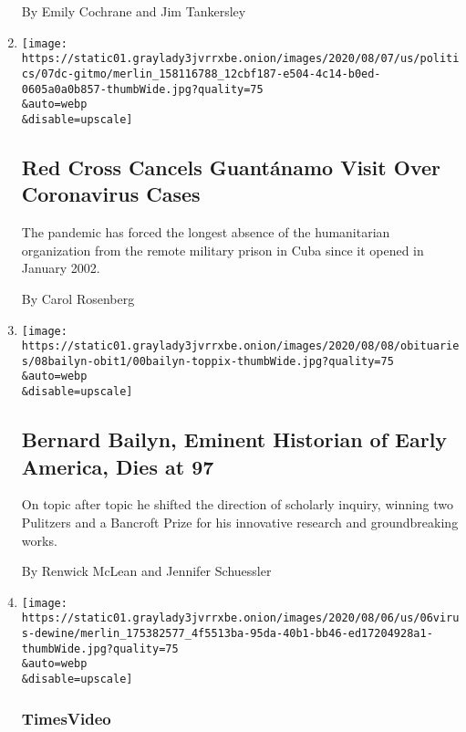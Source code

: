 \begin{enumerate}
  By Emily Cochrane and Jim Tankersley
\item
  \href{/2020/08/07/us/politics/red-cross-guantanamo-coronavirus.html}{}

  \texttt{[image: https://static01.graylady3jvrrxbe.onion/images/2020/08/07/us/politics/07dc-gitmo/merlin\_158116788\_12cbf187-e504-4c14-b0ed-0605a0a0b857-thumbWide.jpg?quality=75\\\&auto=webp\\\&disable=upscale]}

  \hypertarget{red-cross-cancels-guantuxe1namo-visit-over-coronavirus-cases}{%
  \subsection{Red Cross Cancels Guantánamo Visit Over Coronavirus
  Cases}\label{red-cross-cancels-guantuxe1namo-visit-over-coronavirus-cases}}

  The pandemic has forced the longest absence of the humanitarian
  organization from the remote military prison in Cuba since it opened
  in January 2002.

  By Carol Rosenberg
\item
  \href{/2020/08/07/books/bernard-bailyn-dead.html}{}

  \texttt{[image: https://static01.graylady3jvrrxbe.onion/images/2020/08/08/obituaries/08bailyn-obit1/00bailyn-toppix-thumbWide.jpg?quality=75\\\&auto=webp\\\&disable=upscale]}

  \hypertarget{bernard-bailyn-eminent-historian-of-early-america-dies-at-97}{%
  \subsection{Bernard Bailyn, Eminent Historian of Early America, Dies
  at
  97}\label{bernard-bailyn-eminent-historian-of-early-america-dies-at-97}}

  On topic after topic he shifted the direction of scholarly inquiry,
  winning two Pulitzers and a Bancroft Prize for his innovative research
  and groundbreaking works.

  By Renwick McLean and Jennifer Schuessler
\item
  \href{/video/us/politics/100000007279160/coronavirus-ohio-governor.html}{}

  \texttt{[image: https://static01.graylady3jvrrxbe.onion/images/2020/08/06/us/06virus-dewine/merlin\_175382577\_4f5513ba-95da-40b1-bb46-ed17204928a1-thumbWide.jpg?quality=75\\\&auto=webp\\\&disable=upscale]}

  \hypertarget{timesvideo}{%
  \subsubsection{TimesVideo}\label{timesvideo}}


\end{enumerate}
